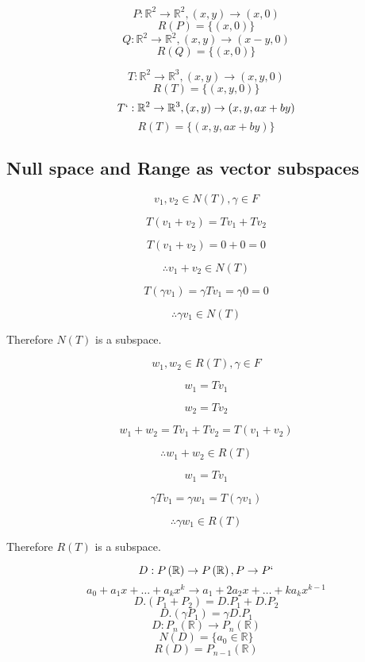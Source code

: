 \documentclass[11pt,a4paper]{colorart}
\def\l{\left}
\def\r{\right}
\def\R{\mathbb{R}}
\def\g{\gamma}
\begin{document}
\begin{example}[Projection]
	\[ P:\R^2\rightarrow\R^2,\l(x,y\r)\rightarrow\l(x,0\r)\]
	\[ R\l(P\r) = \{\l(x,0\r)\} \]
	\[ Q:\R^2\rightarrow\R^2,\l(x,y\r)\rightarrow\l(x-y,0\r)\]
	\[ R\l(Q\r) = \{\l(x,0\r)\} \]
\end{example}

\begin{example}[Inclusion]
	\[ T:\R^2\rightarrow\R^3,\l(x,y\r)\rightarrow\l(x,y,0\r)\]
	\[ R\l(T\r) = \{\l(x,y,0\r)\} \]
	\[ T`:\R^2\rightarrow\R^3,\l(x,y\r)\rightarrow\l(x,y,ax+by\r)\]
	\[ R\l(T\r) = \{\l(x,y,ax+by\r)\} \]
\end{example}

\subsection{Null space and Range as vector subspaces}

\[ v_1,v_2\in N\l(T\r),\g\in F \]

\[ T\l(v_1+v_2\r) = Tv_1 + Tv_2 \]

\[ T\l(v_1+v_2\r) = 0 + 0 = 0 \]

\[ \therefore v_1+v_2 \in N\l(T\r)  \]

\[ T\l(\g v_1\r) = \g Tv_1 = \g 0 = 0 \]

\[ \therefore \g v_1 \in N\l(T\r) \]

Therefore $ N\l(T\r)$ is a subspace.

\[ w_1,w_2\in R\l(T\r),\g\in F \]

\[ w_1 = Tv_1 \]

\[ w_2 = Tv_2 \]

\[ w_1+w_2 = Tv_1 + Tv_2 = T\l(v_1+v_2\r) \]

\[ \therefore w_1+w_2 \in R\l(T\r)  \]

\[ w_1 = Tv_1 \]

\[ \g Tv_1 = \g w_1 = T\l(\g v_1\r) \]

\[ \therefore \g w_1 \in R\l(T\r) \]

Therefore $ R\l(T\r)$ is a subspace.

\begin{example}[Differentiation]
	\[ D:P\l(\R\r) \rightarrow P\l(\R\r),P\rightarrow P` \]
	\[ a_0+a_1x+\dots+a_kx^k \rightarrow a_1+2a_2x+\dots+ka_kx^{k-1} \]
	\[ D.\l(P_1+P_2\r) = D.P_1 + D.P_2   \]
	\[ D.\l(\g P_1\r) = \g D.P_1    \]
	\[ D:P_n\l(\R\r) \rightarrow P_n\l(\R\r) \]
	\[ N\l(D\r) = \{a_0 \in\R\} \]
	\[ R\l(D\r) = P_{n-1}\l(\R\r) \]
\end{example}
\end{document}
